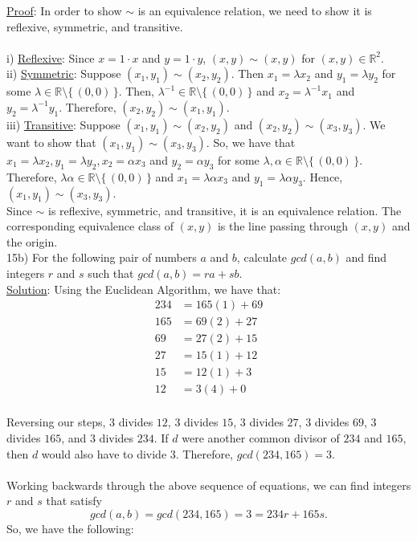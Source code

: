 \documentclass{article}
\begin{document}
\noindent
\underline{Proof}: In order to show $\sim$ is an equivalence relation, we need to show it is reflexive, symmetric, and transitive. \\\\
i) \underline{Reflexive}: Since $x = 1 \cdot x$ and $y = 1 \cdot y$, $(x, y) \sim (x, y)$ for $(x, y) \in \mathbb{R}^{2}.$ \\
ii) \underline{Symmetric}: Suppose $(x_1, y_1) \sim (x_2, y_2).$ Then $x_1 = \lambda x_2$ and $y_1 = \lambda y_2$ for some $\lambda \in \mathbb{R} \setminus \{\,(0,0)\,\}.$ Then, $\lambda^{-1} \in \mathbb{R} \setminus \{\,(0,0)\,\}$ and $x_2 = \lambda^{-1} x_1$ and $y_2 = \lambda^{-1} y_1.$ Therefore, $(x_2, y_2) \sim (x_1, y_1).$ \\
iii) \underline{Transitive}: Suppose $(x_1, y_1) \sim (x_2, y_2)$ and $(x_2, y_2) \sim (x_3, y_3).$ We want to show that $(x_1, y_1) \sim (x_3, y_3).$ So, we have that $x_1 = \lambda x_2, y_1 = \lambda y_2, x_2 = \alpha x_3$ and $y_2 = \alpha y_3$ for some $\lambda, \alpha \in \mathbb{R} \setminus \{\,(0,0)\,\}.$ Therefore, $\lambda \alpha \in \mathbb{R} \setminus \{\,(0,0)\,\}$ and $x_1 = \lambda \alpha x_3$ and $y_1 = \lambda \alpha y_3$. Hence, $(x_1, y_1) \sim (x_3, y_3).$ \\

\noindent
Since $\sim$ is reflexive, symmetric, and transitive, it is an equivalence relation.  The corresponding equivalence class of $(x, y)$ is the line passing through $(x, y)$ and the origin. \\

\noindent
15b) For the following pair of numbers $a$ and $b$, calculate $gcd(a, b)$ and find integers $r$ and $s$ such that $gcd(a, b) = ra + sb. $ \\

\noindent
\underline{Solution}: Using the Euclidean Algorithm, we have that:
\begin{align*}
234 &= 165(1) + 69 \\
165 &= 69(2) + 27 \\
69 &= 27(2) + 15 \\
27 &= 15(1) + 12 \\
15 &= 12(1) + 3 \\
12 &= 3(4) + 0 \\
\end{align*}

\noindent
Reversing our steps, $3$ divides $12$, $3$ divides $15$, $3$ divides $27$, $3$ divides $69$, $3$ divides $165$, and $3$ divides $234.$  If $d$ were another common divisor of $234$ and $165$, then $d$ would also have to divide $3$. Therefore, $gcd(234, 165) = 3.$\\\\
Working backwards through the above sequence of equations, we can  find integers $r$ and $s$ that satisfy
$$gcd(a,b) = gcd(234, 165) = 3 = 234r + 165s.$$ So, we have the following:
\end{document}
